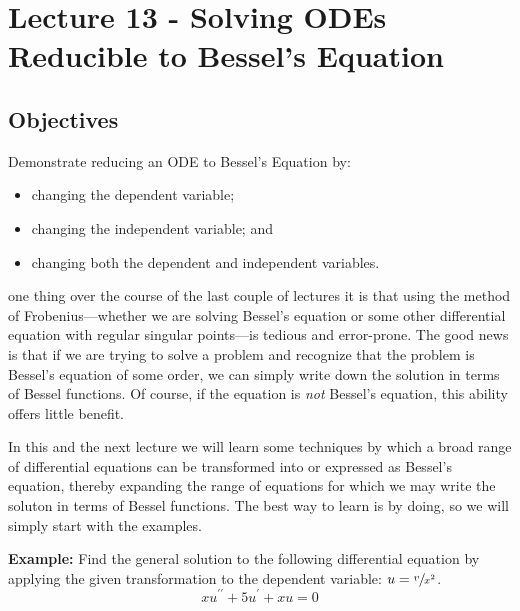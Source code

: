 \chapter{Lecture 13 - Solving ODEs Reducible to Bessel's Equation}
\label{ch:lec13}
\section{Objectives}
Demonstrate reducing an ODE to Bessel's Equation by:
\begin{itemize}
\item changing the dependent variable;
\item changing the independent variable; and
\item changing both the dependent and independent variables.
\end{itemize}

 one thing over the course of the last couple of lectures it is that using the method of Frobenius---whether we are solving Bessel's equation or some other differential equation with regular singular points---is tedious and error-prone.  The good news is that if we are trying to solve a problem and recognize that the problem is Bessel's equation of some order, we can simply write down the solution in terms of Bessel functions.  Of course, if the equation is \emph{not} Bessel's equation, this ability offers little benefit.

In this and the next lecture we will learn some techniques by which a broad range of differential equations can be transformed into or expressed as Bessel's equation, thereby expanding the range of equations for which we may write the soluton in terms of Bessel functions.  The best way to learn is by doing, so we will simply start with the examples.

\vspace{0.5cm}

\noindent\textbf{Example:} Find the general solution to the following differential equation by applying the given transformation to the dependent variable: $u = \sfrac{v}{x^2}$.
\begin{equation*}
xu^{\prime \prime} + 5u^{\prime} + xu = 0
\end{equation*}

\vspace{4.0cm}

